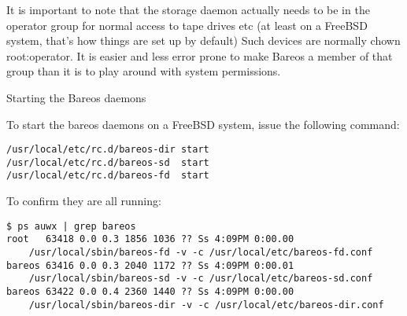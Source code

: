 {It is important to note that the storage daemon actually needs  to be in the
operator group for normal access to tape drives etc (at  least on a FreeBSD
system, that's how things are set up by default)  Such devices are normally
chown root:operator. It is easier and less  error prone  to make Bareos a
member of that group than it is to play around  with system permissions.

Starting the Bareos daemons

To start the bareos daemons on a FreeBSD system, issue the following command:

\footnotesize
\begin{verbatim}
/usr/local/etc/rc.d/bareos-dir start
/usr/local/etc/rc.d/bareos-sd  start
/usr/local/etc/rc.d/bareos-fd  start
\end{verbatim}
\normalsize

To confirm they are all running:

\footnotesize
\begin{verbatim}
$ ps auwx | grep bareos
root   63418 0.0 0.3 1856 1036 ?? Ss 4:09PM 0:00.00
    /usr/local/sbin/bareos-fd -v -c /usr/local/etc/bareos-fd.conf
bareos 63416 0.0 0.3 2040 1172 ?? Ss 4:09PM 0:00.01
    /usr/local/sbin/bareos-sd -v -c /usr/local/etc/bareos-sd.conf
bareos 63422 0.0 0.4 2360 1440 ?? Ss 4:09PM 0:00.00
    /usr/local/sbin/bareos-dir -v -c /usr/local/etc/bareos-dir.conf
\end{verbatim}
\normalsize
}